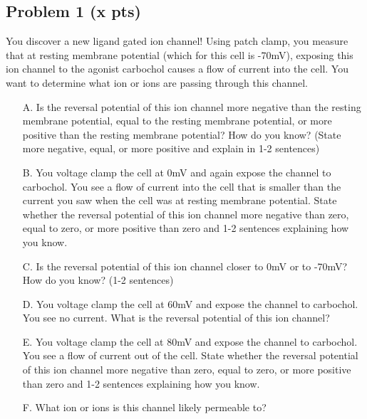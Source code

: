 \documentclass{article}
\begin{document}
\subsection*{Problem 1 (x pts)}
You discover a new ligand gated ion channel! Using patch clamp, you measure that at resting membrane potential (which for this cell is -70mV), exposing this ion channel to the agonist carbochol causes a flow of current into the cell. You want to determine what ion or ions are passing through this channel.\\
\begin{enumerate}
    \item[A. ] Is the reversal potential of this ion channel more negative than the resting membrane potential, equal to the resting membrane potential, or more positive than the resting membrane potential? How do you know? (State more negative, equal, or more positive and explain in 1-2 sentences)
    \item[B. ] You voltage clamp the cell at 0mV and again expose the channel to carbochol. You see a flow of current into the cell that is smaller than the current you saw when the cell was at resting membrane potential. State whether the reversal potential of this ion channel more negative than zero, equal to zero, or more positive than zero and 1-2 sentences explaining how you know.
    \item[C. ] Is the reversal potential of this ion channel closer to 0mV or to -70mV? How do you know? (1-2 sentences)
    \item[D. ] You voltage clamp the cell at 60mV and expose the channel to carbochol. You see no current. What is the reversal potential of this ion channel?
    \item[E. ] You voltage clamp the cell at 80mV and expose the channel to carbochol. You see a flow of current out of the cell. State whether the reversal potential of this ion channel more negative than zero, equal to zero, or more positive than zero and 1-2 sentences explaining how you know.
    \item[F. ] What ion or ions is this channel likely permeable to?
\end{enumerate}
\end{document}
